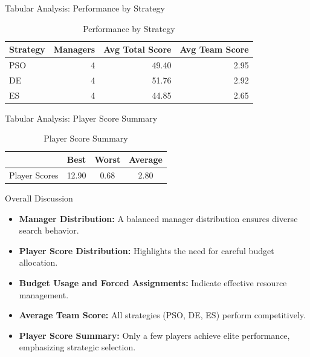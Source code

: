 \documentclass{beamer}
\begin{document}
	\begin{frame}{Tabular Analysis: Performance by Strategy}
		\begin{table}[H]
			\centering
			\caption{Performance by Strategy}
			\begin{tabular}{lrrr}
				\toprule
				\textbf{Strategy} & \textbf{Managers} & \textbf{Avg Total Score} & \textbf{Avg Team Score} \\
				\midrule
				PSO & 4 & 49.40 & 2.95 \\
				DE  & 4 & 51.76 & 2.92 \\
				ES  & 4 & 44.85 & 2.65 \\
				\bottomrule
			\end{tabular}
		\end{table}
	\end{frame}
	
	\begin{frame}{Tabular Analysis: Player Score Summary}
		\begin{table}[H]
			\centering
			\caption{Player Score Summary}
			\begin{tabular}{lccc}
				\toprule
				& \textbf{Best} & \textbf{Worst} & \textbf{Average} \\
				\midrule
				Player Scores & 12.90 & 0.68 & 2.80 \\
				\bottomrule
			\end{tabular}
		\end{table}
	\end{frame}
	
	\begin{frame}{Overall Discussion}
		\begin{itemize}
			\item \textbf{Manager Distribution:} A balanced manager distribution ensures diverse search behavior.
			\item \textbf{Player Score Distribution:} Highlights the need for careful budget allocation.
			\item \textbf{Budget Usage and Forced Assignments:} Indicate effective resource management.
			\item \textbf{Average Team Score:} All strategies (PSO, DE, ES) perform competitively.
			\item \textbf{Player Score Summary:} Only a few players achieve elite performance, emphasizing strategic selection.
		\end{itemize}
	\end{frame}
	
\end{document}
